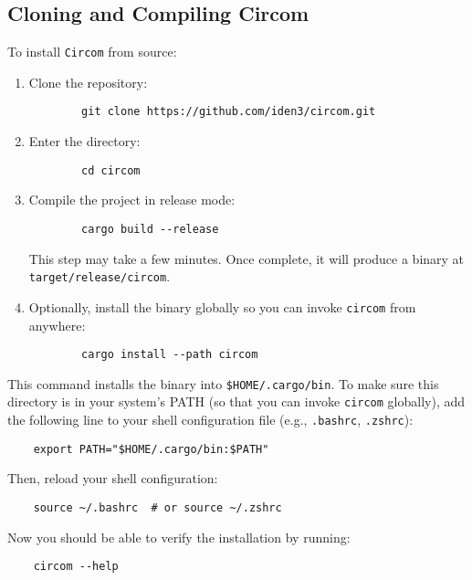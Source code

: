 \documentclass{article}
\begin{document}
\subsection{Cloning and Compiling Circom}

To install \texttt{Circom} from source:

\begin{enumerate}
	\item Clone the repository:
	\begin{verbatim}
		git clone https://github.com/iden3/circom.git
	\end{verbatim}
	
	\item Enter the directory:
	\begin{verbatim}
		cd circom
	\end{verbatim}
	
	\item Compile the project in release mode:
	\begin{verbatim}
		cargo build --release
	\end{verbatim}
	
	This step may take a few minutes. Once complete, it will produce a binary at \texttt{target/release/circom}.
	
	\item Optionally, install the binary globally so you can invoke \texttt{circom} from anywhere:
	\begin{verbatim}
		cargo install --path circom
	\end{verbatim}
\end{enumerate}

This command installs the binary into \texttt{\$HOME/.cargo/bin}. To make sure this directory is in your system's PATH (so that you can invoke \texttt{circom} globally), add the following line to your shell configuration file (e.g., \texttt{.bashrc}, \texttt{.zshrc}):

\begin{verbatim}
	export PATH="$HOME/.cargo/bin:$PATH"
\end{verbatim}

Then, reload your shell configuration:

\begin{verbatim}
	source ~/.bashrc  # or source ~/.zshrc
\end{verbatim}

Now you should be able to verify the installation by running:

\begin{verbatim}
	circom --help
\end{verbatim}
\end{document}
